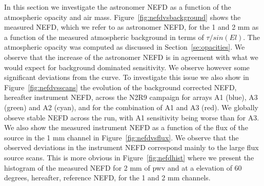 In this section we investigate the astronomer NEFD as a function of the atmospheric opacity and air mass. Figure~\ref{fig:nefdvsbackground} shows the measured NEFD, which we refer to as astronomer NEFD, for the 1 and 2 mm as a function of the measured atmospheric background in terms of $\tau/sin(El)$. The atmospheric opacity was computed as discussed in Section~\ref{se:opacities}. We observe that the increase of the astronomer NEFD is in agreement with what we would expect for background dominated sensitivity. We observe however some significant deviations from the curve. To investigate this issue we also show in Figure~\ref{fig:nefdvsscans} the evolution of the background corrected NEFD, hereafter instrument NEFD, across the N2R9 campaign for arrays A1 (blue), A3 (green) and A2 (cyan), and for the combination of A1 and A3 (red). We globally obseve stable NEFD across the run, with A1 sensitivity being worse than for A3. We also show the measured instrument NEFD as a function of the flux of the source in the 1 mm channel in Figure~\ref{fig:nefdvsflux}. We observe that the observed deviations in the instrument NEFD correspond mainly to the large flux source scans. This is more obvious in Figure~\ref{fig:nefdhist} where we present the histogram of the measured NEFD for 2 mm of pwv and at a elevation of 60 degrees, hereafter, reference NEFD, for the 1 and 2 mm channels.


